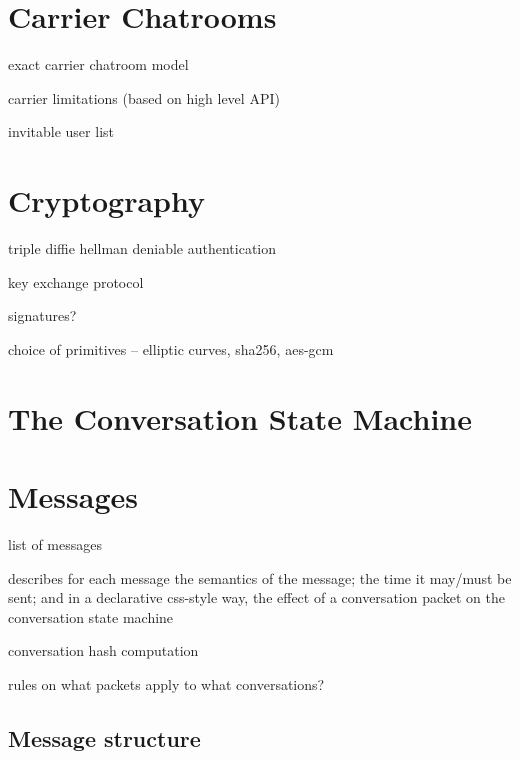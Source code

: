 \documentclass{article}
\begin{document}



\section{Carrier Chatrooms}
\label{sec:carrier-chatrooms}
exact carrier chatroom model

carrier limitations (based on high level API)

invitable user list


\section{Cryptography}
\label{sec:cryptography}
triple diffie hellman deniable authentication

key exchange protocol

signatures?

choice of primitives -- elliptic curves, sha256, aes-gcm


\section{The Conversation State Machine}







\section{Messages}
list of messages

describes for each message the semantics of the message; the time it may/must be sent; and in a declarative css-style way, the effect of a conversation packet on the conversation state machine

conversation hash computation

rules on what packets apply to what conversations?

\subsection{Message structure}
\end{document}
